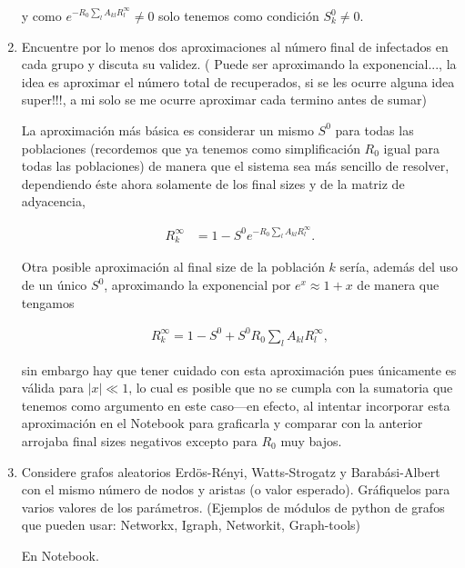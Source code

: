 \documentclass[answers]{exam}
\begin{document}
\begin{questions}
\begin{enumerate}
\begin{solution}
y como $e^{-R_0\sum_lA_{kl}R_l^\infty} \neq 0$ solo tenemos como condición $S_k^0 \neq 0$.
\end{solution}

\item Encuentre por lo menos dos aproximaciones al n\'umero final de infectados en cada grupo y discuta su validez. ( Puede ser aproximando la exponencial..., la idea es aproximar el n\'umero total de recuperados, si se les ocurre alguna idea super!!!, a mi solo se me ocurre aproximar cada termino antes de sumar)

\begin{solution}
La aproximación más básica es considerar un mismo $S^0$ para todas las poblaciones (recordemos que ya tenemos como simplificación $R_0$ igual para todas las poblaciones) de manera que el sistema sea más sencillo de resolver, dependiendo éste ahora solamente de los final sizes y de la matriz de adyacencia,

\begin{align*}
    R_k^\infty &= 1 - S^0e^{-R_0\sum_lA_{kl}R_l^\infty}.
\end{align*}

Otra posible aproximación al final size de la población $k$ sería, además del uso de un único $S^0$, aproximando la exponencial por $e^x \approx 1 + x$ de manera que tengamos

\begin{align*}
    R_k^\infty = 1 - S^0 + S^0R_0\sum_lA_{kl}R_l^\infty,
\end{align*}

sin embargo hay que tener cuidado con esta aproximación pues únicamente es válida para $|x| \ll 1$, lo cual es posible que no se cumpla con la sumatoria que tenemos como argumento en este caso---en efecto, al intentar incorporar esta aproximación en el Notebook para graficarla y comparar con la anterior arrojaba final sizes negativos excepto para $R_0$ muy bajos.
\end{solution}

\item Considere grafos aleatorios Erd\"os-R\'enyi, Watts-Strogatz y Barab\'asi-Albert con el mismo n\'umero de nodos y aristas (o valor esperado).  Gr\'afiquelos para varios valores de los par\'ametros. (Ejemplos de m\'odulos de python de grafos que pueden usar: Networkx, Igraph, Networkit, Graph-tools)

\begin{solution}
En Notebook.
\end{solution}


\end{enumerate}
\end{questions}
\end{document}
